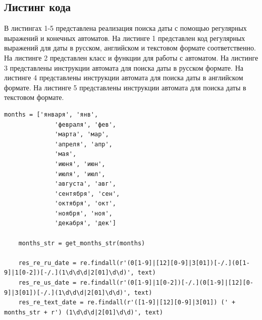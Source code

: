 \documentclass[a4paper, 14pt]{article}
\begin{document}
        \subsection{Листинг кода}
        В листингах 1-5 представлена реализация поиска даты с помощью регулярных выражений и конечных автоматов. На листинге 1 представлен код регулярных выражений для даты в русском, английском и текстовом формате соответственно. На листинге 2 представлен класс и функции для работы с автоматом. На листинге 3 представлены инструкции автомата для поиска даты в русском формате. На листинге 4 представлены инструкции автомата для поиска даты в английском формате. На листинге 5 представлены инструкции автомата для поиска даты в текстовом формате.
		\begin{lstlisting}[label=some-code,caption=Листинг разработанных регулярных выражений]
		months = ['января', 'янв',
              'февраля', 'фев',
              'марта', 'мар',
              'апреля', 'апр',
              'мая',
              'июня', 'июн',
              'июля', 'июл',
              'августа', 'авг',
              'сентября', 'сен',
              'октября', 'окт',
              'ноября', 'ноя',
              'декабря', 'дек']

    months_str = get_months_str(months)

    res_re_ru_date = re.findall(r'(0[1-9]|[12][0-9]|3[01])[-/.](0[1-9]|1[0-2])[-/.](1\d\d\d|2[01]\d\d)', text)
    res_re_us_date = re.findall(r'(0[1-9]|1[0-2])[-/.](0[1-9]|[12][0-9]|3[01])[-/.](1\d\d\d|2[01]\d\d)', text)
    res_re_text_date = re.findall(r'([1-9]|[12][0-9]|3[01]) (' + months_str + r') (1\d\d\d|2[01]\d\d)', text)
		\end{lstlisting}
\end{document}
